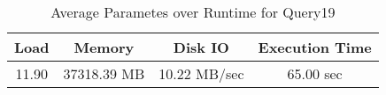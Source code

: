 \documentclass[../../main.tex]{subfiles}
\begin{document}
    \begin{table}
        \begin{center}
            \begin{tabular}{ |c|c|c|c| } 
            \hline
            Load & Memory & Disk IO & Execution Time\\
            \hline
            11.90 & 37318.39 MB & 10.22 MB/sec & 65.00 sec \\
            \hline
            \end{tabular}
            \\[1pt]
            \caption{Average Parametes over Runtime for Query19}
        \end{center}
    \end{table}
    \pagebreak
\end{document}
